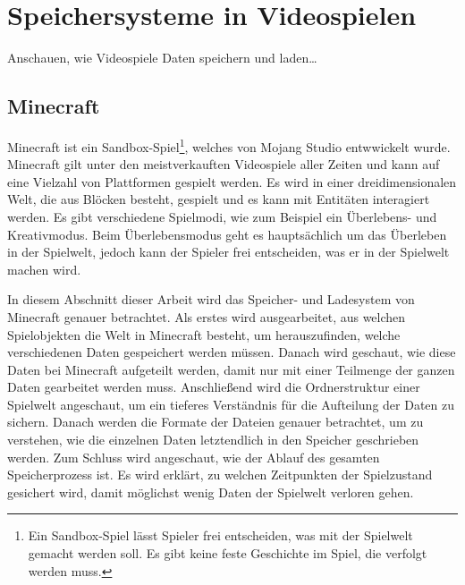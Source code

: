 \chapter{Speichersysteme in Videospielen}\label{ch:videospiele}
Anschauen, wie Videospiele Daten speichern und laden\dots


\section{Minecraft}
Minecraft ist ein Sandbox-Spiel\footnote{Ein Sandbox-Spiel lässt Spieler frei entscheiden, was mit der Spielwelt gemacht werden soll. Es gibt keine feste Geschichte im Spiel, die verfolgt werden muss.\cite{ocio2009multi}}, welches von Mojang Studio entwwickelt wurde. Minecraft gilt unter den meistverkauften Videospiele aller Zeiten und kann auf eine Vielzahl von Plattformen gespielt werden.\cite{ignBestSellingVideo} Es wird in einer dreidimensionalen Welt, die aus Blöcken besteht, gespielt und es kann mit Entitäten interagiert werden. Es gibt verschiedene Spielmodi, wie zum Beispiel ein Überlebens- und Kreativmodus. Beim Überlebensmodus geht es hauptsächlich um das Überleben in der Spielwelt, jedoch kann der Spieler frei entscheiden, was er in der Spielwelt machen wird.\cite{minecraftWikiHome}

In diesem Abschnitt dieser Arbeit wird das Speicher- und Ladesystem von Minecraft genauer betrachtet. Als erstes wird ausgearbeitet, aus welchen Spielobjekten die Welt in Minecraft besteht, um herauszufinden, welche verschiedenen Daten gespeichert werden müssen. Danach wird geschaut, wie diese Daten bei Minecraft aufgeteilt werden, damit nur mit einer Teilmenge der ganzen Daten gearbeitet werden muss. Anschließend wird die Ordnerstruktur einer Spielwelt angeschaut, um ein tieferes Verständnis für die Aufteilung der Daten zu sichern. Danach werden die Formate der Dateien genauer betrachtet, um zu verstehen, wie die einzelnen Daten letztendlich in den Speicher geschrieben werden. Zum Schluss wird angeschaut, wie der Ablauf des gesamten Speicherprozess ist. Es wird erklärt, zu welchen Zeitpunkten der Spielzustand gesichert wird, damit möglichst wenig Daten der Spielwelt verloren gehen. 




